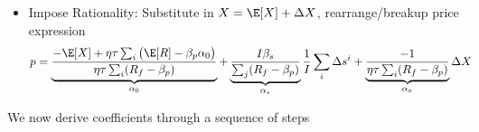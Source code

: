 \documentclass[12pt]{article}
\theoremstyle{plain}
\theoremstyle{definition}
\theoremstyle{remark}
\begin{document}
\begin{itemize}
  \item
    Impose Rationality:
    Substitute in $X=\E[X]+\Delta X$, rearrange/breakup price expression
    \begin{align*}
      p
      &=
      \underbrace{%
        \frac{%
          -\E[X]
          +
          \eta \tau
          \sum_i
          \big(
            \E[R]
            - \beta_p \alpha_0
          \big)
        }{%
          \eta \tau
          \sum_i
          (R_f-\beta_p)
        }
      }_{\alpha_0}
      +
      \underbrace{%
        \frac{%
          I\beta_s
        }{%
          \sum_j
          (R_f-\beta_p)
        }
      }_{\alpha_s}
      \frac{1}{I}
      \sum_i
      \Delta s^i
      +
      \underbrace{%
        \frac{%
          - 1
        }{%
          \eta \tau
          \sum_i
          (R_f-\beta_p)
        }
      }_{\alpha_x}
      \Delta X
    \end{align*}
\end{itemize}
We now derive coefficients through a sequence of steps
\end{document}
